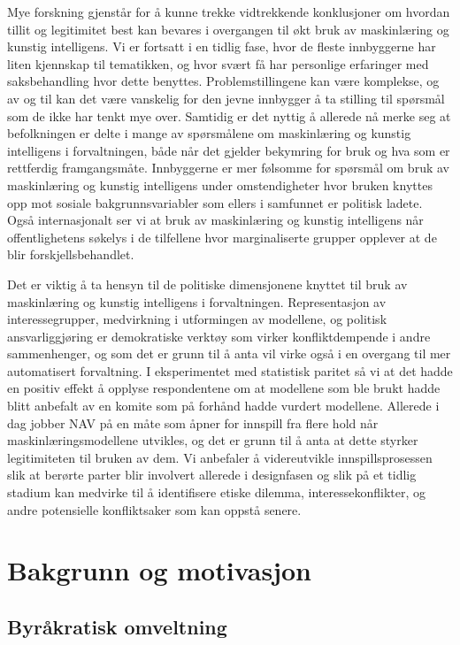 \documentclass[
]{book}
\begin{document}
Mye forskning gjenstår for å kunne trekke vidtrekkende konklusjoner om hvordan tillit og legitimitet best kan bevares i overgangen til økt bruk av maskinlæring og kunstig intelligens.
Vi er fortsatt i en tidlig fase, hvor de fleste innbyggerne har liten kjennskap til tematikken, og hvor svært få har personlige erfaringer med saksbehandling hvor dette benyttes.
Problemstillingene kan være komplekse, og av og til kan det være vanskelig for den jevne innbygger å ta stilling til spørsmål som de ikke har tenkt mye over.
Samtidig er det nyttig å allerede nå merke seg at befolkningen er delte i mange av spørsmålene om maskinlæring og kunstig intelligens i forvaltningen, både når det gjelder bekymring for bruk og hva som er rettferdig framgangsmåte.
Innbyggerne er mer følsomme for spørsmål om bruk av maskinlæring og kunstig intelligens under omstendigheter hvor bruken knyttes opp mot sosiale bakgrunnsvariabler som ellers i samfunnet er politisk ladete.
Også internasjonalt ser vi at bruk av maskinlæring og kunstig intelligens når offentlighetens søkelys i de tilfellene hvor marginaliserte grupper opplever at de blir forskjellsbehandlet.

Det er viktig å ta hensyn til de politiske dimensjonene knyttet til bruk av maskinlæring og kunstig intelligens i forvaltningen.
Representasjon av interessegrupper, medvirkning i utformingen av modellene, og politisk ansvarliggjøring er demokratiske verktøy som virker konfliktdempende i andre sammenhenger, og som det er grunn til å anta vil virke også i en overgang til mer automatisert forvaltning.
I eksperimentet med statistisk paritet så vi at det hadde en positiv effekt å opplyse respondentene om at modellene som ble brukt hadde blitt anbefalt av en komite som på forhånd hadde vurdert modellene.
Allerede i dag jobber NAV på en måte som åpner for innspill fra flere hold når maskinlæringsmodellene utvikles, og det er grunn til å anta at dette styrker legitimiteten til bruken av dem.
Vi anbefaler å videreutvikle innspillsprosessen slik at berørte parter blir involvert allerede i designfasen og slik på et tidlig stadium kan medvirke til å identifisere etiske dilemma, interessekonflikter, og andre potensielle konfliktsaker som kan oppstå senere.

\hypertarget{bakgrunn}{%
\chapter{Bakgrunn og motivasjon}\label{bakgrunn}}

\hypertarget{byruxe5kratisk-omveltning}{%
\section{Byråkratisk omveltning}\label{byruxe5kratisk-omveltning}}
\end{document}
